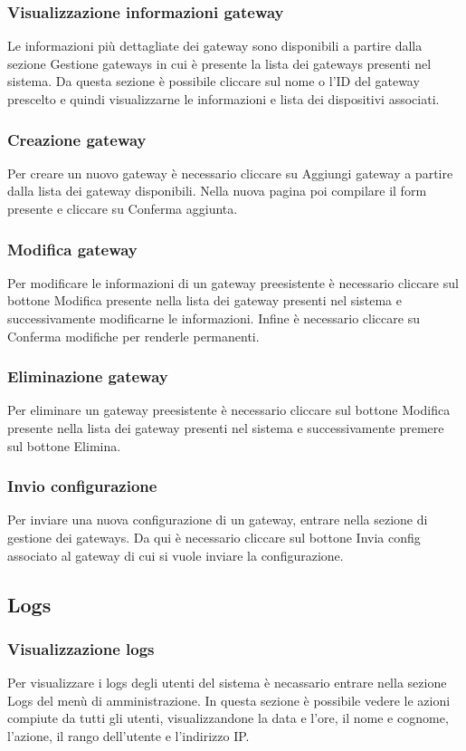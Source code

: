 	\subsubsection{Visualizzazione informazioni gateway}
		Le informazioni più dettagliate dei gateway sono disponibili a partire dalla sezione Gestione gateways in cui è presente la lista dei gateways presenti nel sistema.	
		Da questa sezione è possibile cliccare sul nome o l'ID del gateway prescelto e quindi visualizzarne le informazioni e lista dei dispositivi associati.

	\subsubsection{Creazione gateway}	
		Per creare un nuovo gateway è necessario cliccare su Aggiungi gateway a partire dalla lista dei gateway disponibili.
		Nella nuova pagina poi compilare il form presente e cliccare su Conferma aggiunta. 

	\subsubsection{Modifica gateway}	
		Per modificare le informazioni di un gateway preesistente è necessario cliccare sul bottone Modifica presente nella lista dei gateway presenti nel sistema e successivamente modificarne le informazioni. Infine è necessario cliccare su Conferma modifiche per renderle permanenti.

	\subsubsection{Eliminazione gateway}
		Per eliminare un gateway preesistente è necessario cliccare sul bottone Modifica presente nella lista dei gateway presenti nel sistema e successivamente premere sul bottone Elimina.

	\subsubsection{Invio configurazione}
		Per inviare una nuova configurazione di un gateway, entrare nella sezione di gestione dei gateways.
		Da qui è necessario cliccare sul bottone Invia config associato al gateway di cui si vuole inviare la configurazione.


\subsection{Logs}
	
	\subsubsection{Visualizzazione logs}
		Per visualizzare i logs degli utenti del sistema è necassario entrare nella sezione Logs del menù di amministrazione. In questa sezione è possibile vedere le azioni compiute da tutti gli utenti, visualizzandone la data e l'ore, il nome e cognome, l'azione, il rango dell'utente e l'indirizzo IP.